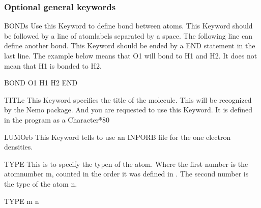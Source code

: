 \subsubsection{Optional general keywords}
\begin{keywordlist}
\item[BONDs]
Use this Keyword to define bond between atoms.
This Keyword should be followed by a line of atomlabels
separated by a space. The following line can define
another bond. This Keyword should be ended by a END statement
in the last line. The example below means that O1 will bond to H1 and H2.
It does not mean that H1 is bonded to H2.
\begin{inputlisting}
BOND
O1 H1 H2
END
\end{inputlisting}

\item[TITLe]
This Keyword specifies the title of the molecule. This will be
recognized by the Nemo package. And you are requested to use
this Keyword. It is defined in the program as a Character*80

\item[LUMOrb]
This Keyword tells  to use an INPORB file for
the one electron densities.

\item[TYPE]
This is to specify the typen of the atom.
Where the first number is the atomnumber m, counted in the order it was defined in .
The second number is the type of the atom n.
\begin{inputlisting}
TYPE
m n
\end{inputlisting}


\end{keywordlist}

